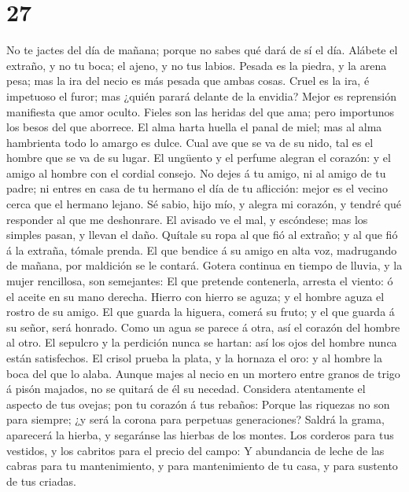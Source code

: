\hypertarget{section-26}{%
\section{27}\label{section-26}}

 No te jactes del día de mañana; porque no sabes qué dará de
sí el día.  Alábete el extraño, y no tu boca; el ajeno, y no
tus labios.  Pesada es la piedra, y la arena pesa; mas la
ira del necio es más pesada que ambas cosas.  Cruel es la
ira, é impetuoso el furor; mas ¿quién parará delante de la envidia?
 Mejor es reprensión manifiesta que amor oculto.
 Fieles son las heridas del que ama; pero importunos los
besos del que aborrece.  El alma harta huella el panal de
miel; mas al alma hambrienta todo lo amargo es dulce.  Cual
ave que se va de su nido, tal es el hombre que se va de su lugar.
 El ungüento y el perfume alegran el corazón: y el amigo al
hombre con el cordial consejo.  No dejes á tu amigo, ni al
amigo de tu padre; ni entres en casa de tu hermano el día de tu
aflicción: mejor es el vecino cerca que el hermano lejano. 
Sé sabio, hijo mío, y alegra mi corazón, y tendré qué responder al que
me deshonrare.  El avisado ve el mal, y escóndese; mas los
simples pasan, y llevan el daño.  Quítale su ropa al que
fió al extraño; y al que fió á la extraña, tómale prenda. 
El que bendice á su amigo en alta voz, madrugando de mañana, por
maldición se le contará.  Gotera continua en tiempo de
lluvia, y la mujer rencillosa, son semejantes:  El que
pretende contenerla, arresta el viento: ó el aceite en su mano derecha.
 Hierro con hierro se aguza; y el hombre aguza el rostro de
su amigo.  El que guarda la higuera, comerá su fruto; y el
que guarda á su señor, será honrado.  Como un agua se
parece á otra, así el corazón del hombre al otro.  El
sepulcro y la perdición nunca se hartan: así los ojos del hombre nunca
están satisfechos.  El crisol prueba la plata, y la hornaza
el oro: y al hombre la boca del que lo alaba.  Aunque majes
al necio en un mortero entre granos de trigo á pisón majados, no se
quitará de él su necedad.  Considera atentamente el aspecto
de tus ovejas; pon tu corazón á tus rebaños:  Porque las
riquezas no son para siempre; ¿y será la corona para perpetuas
generaciones?  Saldrá la grama, aparecerá la hierba, y
segaránse las hierbas de los montes.  Los corderos para tus
vestidos, y los cabritos para el precio del campo:  Y
abundancia de leche de las cabras para tu mantenimiento, y para
mantenimiento de tu casa, y para sustento de tus criadas.

